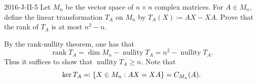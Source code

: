 \documentclass{article}
\begin{document}
	\begin{prb}{2016-J-II-5}
		Let $M_{n}$ be the vector space of $n \times n$ complex matrices. For $A \in M_{n}$, define the linear transformation $T_{A}$ on $M_{n}$ by $T_{A}(X) \coloneqq AX - XA$. Prove that the rank of $T_{A}$ is at most $n^{2} - n$. 
	\end{prb}
	By the rank-nullity theorem, one has that 
	\begin{equation*}
		\operatorname{rank}{T_{A}} = \dim{M_{n}} - \operatorname{nullity}{T_{A}} = n^{2} - \operatorname{nullity}{T_{A}}. 
	\end{equation*}
	Thus it suffices to show that $\operatorname{nullity}{T_{A}} \geq n$. Note that 
	\begin{equation*}
		\ker{T_{A}} \eqqcolon \brac*{X \in M_{n}: AX = XA} = C_{M_{n}}(A). 
	\end{equation*}
\end{document}
